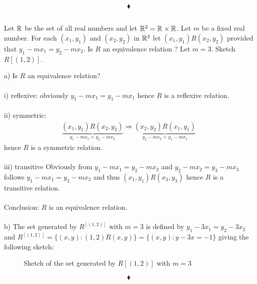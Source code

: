 $$\blacklozenge$$


\subsection{}
\begin{tcolorbox}
Let $\mathbb{R}_{}$ be the set of all real numbers and let $\mathbb{R}_{}^2 = \mathbb{R}_{}\times\mathbb{R}_{}$. Let $m$ be a fixed real number. For each $(x_1, y_1)$ and $(x_2, y_2)$ in $\mathbb{R}_{}^2$ let $(x_1, y_1) R (x_2, y_2)$ provided that $y_1 - mx_1= y_2 - mx_2$. Is $R$ an equivalence relation ? Let $m = 3$. Sketch $R[(1, 2)]$. 
\end{tcolorbox}
$$ $$
a) Is $R$ an equivalence relation?\\\\
i) reflexive: obviously $y_1 - mx_1=y_1 - mx_1$ hence $ R$ is a reflexive relation.\\\\
ii) symmetric: 
\begin{align*}
\underbrace{(x_1, y_1) R (x_2, y_2)}_{y_1-mx_1=y_2-mx_2} \Rightarrow \underbrace{(x_2, y_2) R (x_1, y_1)}_{y_2-mx_2=y_1-mx_1}
\end{align*}
hence $R$ is a symmetric relation.\\\\
iii) transitive
Obviously from $y_1-mx_1=y_2-mx_2$ and $y_2-mx_2=y_3-mx_3$ follows $y_1-mx_1=y_3-mx_3$ and thus $(x_1, y_1) R (x_3, y_3)$
hence $R$ is a transitive relation.\\\\
Conclusion: $R$ is an equivalence relation.\\\\

b)
The set generated by $R^[(1,2)]$ with $m=3$ is defined by $y_1-3x_1=y_2-3x_2$ and  $R^[(1,2)]=\{(x,y):(1,2)R(x,y)\} = \{(x,y):y-3x=-1\} $ giving the following sketch:
\begin{figure}[H]%
    \centering
    
\caption{Sketch of the set generated by $R[(1,2)]$ with $m=3$}
\label{fig:fig_p8b}
\end{figure}

$$\blacklozenge$$



